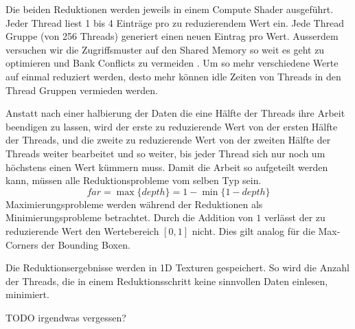 \documentclass[runningheaders,a4paper]{llncs}
\begin{document}
Die beiden Reduktionen werden jeweils in einem Compute Shader ausgeführt.
Jeder Thread liest 1 bis 4 Einträge pro zu reduzierendem Wert ein.
Jede Thread Gruppe (von 256 Threads) generiert einen neuen Eintrag pro Wert.
Ausserdem versuchen wir die Zugriffsmuster auf den Shared Memory so weit es geht zu optimieren und Bank Conflicts zu vermeiden \cite{reduction}.
Um so mehr verschiedene Werte auf einmal reduziert werden, desto mehr können idle Zeiten von Threads in den Thread Gruppen vermieden werden.

Anstatt nach einer halbierung der Daten die eine Hälfte der Threads ihre Arbeit beendigen zu lassen, wird der erste zu reduzierende Wert von der ersten Hälfte der Threads, und die zweite zu reduzierende Wert von der zweiten Hälfte der Threads weiter bearbeitet und so weiter, bis jeder Thread sich nur noch um höchstens einen Wert kümmern muss.
Damit die Arbeit so aufgeteilt werden kann, müssen alle Reduktionsprobleme vom selben Typ sein.
\begin{equation}
  far = \max\{ depth \} = 1 - \min \{ 1 - depth \}
\end{equation}
Maximierungsprobleme werden während der Reduktionen als Minimierungsprobleme betrachtet.
Durch die Addition von $1$ verlässt der zu reduzierende Wert den Wertebereich $[0, 1]$ nicht.
Dies gilt analog für die Max-Corners der Bounding Boxen.

Die Reduktionsergebnisse werden in 1D Texturen gespeichert.
So wird die Anzahl der Threads, die in einem Reduktionsschritt keine sinnvollen Daten einlesen, minimiert.




TODO irgendwas vergessen?


\end{document}
